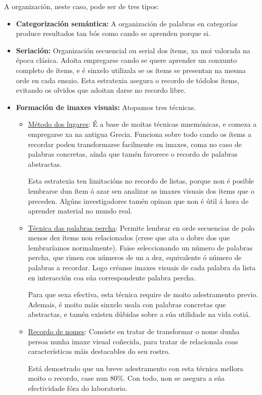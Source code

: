 \documentclass[a4paper,11pt]{article}
\begin{document}
\begin{itemize}
	A organización, neste caso, pode ser de tres tipos:
	\begin{itemize}
		\item \textbf{Categorización semántica:} A organización de palabras en categorías produce
		resultados tan bós como cando se aprenden porque si.
		\item \textbf{Seriación:} Organización secuencial ou serial dos ítems, xa moi valorada na 				época clásica. Adoita empregarse cando se quere aprender un conxunto completo de ítems, e é 			sinxelo utilizala se os ítems se presentan na mesma orde en cada ensaio. Esta estratexia 				asegura o recordo de tódolos ítems, evitando os olvidos que adoitan darse no recordo libre.
		\item \textbf{Formación de imaxes visuais:} Atopamos tres técnicas.
		\begin{itemize}
			\item \underline{Método dos lugares}: É a base de moitas técnicas mnemónicas, e comeza a
			empregarse xa na antigua Grecia. Funciona sobre todo cando os ítems a recordar poden 					transformarse facilmente en imaxes, coma no caso de palabras concretas, aínda que tamén
			favorece o recordo de palabras abstractas. 
			
			Esta estratexia ten limitacións no recordo de listas, porque non é posible lembrarse dun
			ítem ó azar sen analizar as imaxes visuais dos ítems que o preceden. Algúns 							investigadores tamén opinan que non é útil á hora de aprender material no mundo real.
			\item \underline{Técnica das palabras percha}: Permite lembrar en orde secuencias de
			polo menos dez ítems non relacionados (crese que ata o dobre dos que lembraríamos 						normalmente). Faise seleccionando un número de palabras percha, que rimen cos números de 				un a dez, equivalente ó número de palabras a recordar. Logo créanse imaxes visuais de 					cada palabra da lista en interacción coa súa correspondente palabra percha. 
			
			Para que sexa efectiva, esta técnica require de moito adestramento previo. Ademais, é
			moito máis sinxelo usala con palabras concretas que abstractas, e tamén existen dúbidas
			sobre a súa utilidade na vida cotiá.
			\item \underline{Recordo de nomes}: Consiste en tratar de transformar o nome dunha
			persoa nunha imaxe visual coñecida, para tratar de relacionala coas características
			máis destacables do seu rostro. 
			
			Está demostrado que un breve adestramento con esta técnica mellora moito o recordo, case 				nun 80\%. Con todo, non se asegura a súa efectividade fóra do laboratorio. 
		\end{itemize}		 	
	\end{itemize}
\end{itemize}
\end{document}
